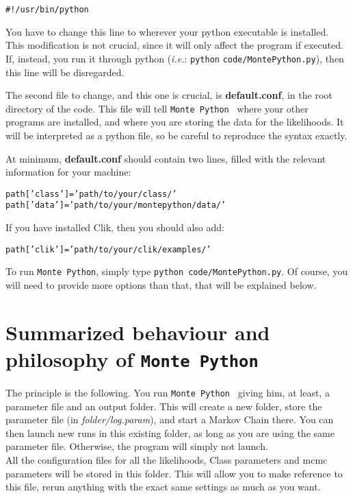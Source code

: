 \documentclass[10pt]{article}
\newcommand{\MP}{\texttt{Monte Python}}
\begin{document}
 \begin{alltt}
    #!/usr/bin/python
 \end{alltt}

 You have to change this line to wherever your python executable is installed.
 This modification is not crucial, since it will only affect the program if
 executed. If, instead, you run it through python (\emph{i.e.}: \verb?python?
 \verb?code/MontePython.py?), then this line will be disregarded.

 The second file to change, and this one is crucial, is {\bf default.conf}, in
 the root directory of the code. This file will tell \MP~ where your
 other programs are installed, and where you are storing the data for the
 likelihoods. It will be interpreted as a python file, so be careful to
 reproduce the syntax exactly.

 At minimum, {\bf default.conf} should contain two lines, filled with the
 relevant information for your machine:
 \begin{alltt}
   path['class']   = 'path/to/your/class/'
   path['data']    = 'path/to/your/montepython/data/'
 \end{alltt}
 
 If you have installed Clik, then you should also add:
 \begin{alltt}
   path['clik']    = 'path/to/your/clik/examples/'
 \end{alltt}
 
 To run \MP, simply type \verb?python code/MontePython.py?. Of course,
 you will need to provide more options than that, that will be explained below. 

\newpage
\section{Summarized behaviour and philosophy of \MP}

  The principle is the following. You run \MP~ giving him, at least, a
  parameter file and an output folder. This will create a new folder, store the
  parameter file (in \emph{folder/log.param}), and start a Markov Chain there.
  You can then launch new runs in this existing folder, as long as you are
  using the same parameter file.  Otherwise, the program will simply not
  launch.\\

  All the configuration files for all the likelihoods, Class parameters and
  mcmc parameters will be stored in this folder. This will allow you to make
  reference to this file, rerun anything with the exact same settings as much
  as you want.\\
\end{document}
